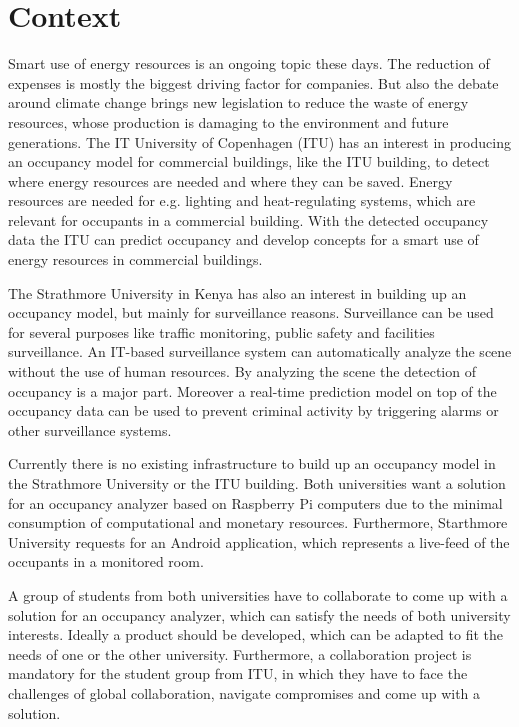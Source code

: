 \section{Context}
\label{sec:Context}


Smart use of energy resources is an ongoing topic these days. The reduction of expenses is mostly the biggest driving factor for companies. But also the debate around climate change brings new legislation to reduce the waste of energy resources, whose production is damaging to the environment and future generations. The IT University of Copenhagen (ITU) has an interest in producing an occupancy model for commercial buildings, like the ITU building, to detect where energy resources are needed and where they can be saved. Energy resources are needed for e.g. lighting and heat-regulating systems, which are relevant for occupants in a commercial building. With the detected occupancy data the ITU can predict occupancy and develop concepts for a smart use of energy resources in commercial buildings.

The Strathmore University in Kenya has also an interest in building up an occupancy model, but mainly for surveillance reasons. Surveillance can be used for several purposes like traffic monitoring, public safety and facilities surveillance. An IT-based surveillance system can automatically analyze the scene without the use of human resources. By analyzing the scene the detection of occupancy is a major part. Moreover a real-time prediction model on top of the occupancy data can be used to prevent criminal activity by triggering alarms or other surveillance systems.

Currently there is no existing infrastructure to build up an occupancy model in the Strathmore University or the ITU building. Both universities want a solution for an occupancy analyzer based on Raspberry Pi computers due to the minimal consumption of computational and monetary resources. Furthermore, Starthmore University requests for an Android application, which represents a live-feed of the occupants in a monitored room.

A group of students from both universities have to collaborate to come up with a solution for an occupancy analyzer, which can satisfy the needs of both university interests. Ideally a product should be developed, which can be adapted to fit the needs of one or the other university.
Furthermore, a collaboration project is mandatory for the student group from ITU, in which they have to face the challenges of global collaboration, navigate compromises and come up with a solution.

